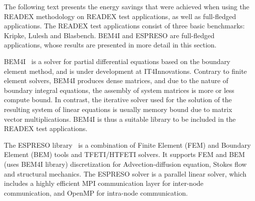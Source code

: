 
The following text presents the energy savings that were achieved when using the READEX methodology on READEX test applications, as well as full-fledged applications. The READEX test applications consist of three basic benchmarks: Kripke, Lulesh and Blasbench. BEM4I and ESPRESO are full-fledged applications, whose results are presented in more detail in this section. 

BEM4I~\cite{ch6_MerZap2013} is a solver for partial differential equations based on the boundary element method, and is under development at IT4Innovations. Contrary to finite element solvers, BEM4I produces dense matrices, and due to the nature of boundary integral equations, the assembly of system matrices is more or less compute bound. In contrast, the iterative solver used for the solution of the resulting system of linear equations is usually memory bound due to matrix vector multiplications. BEM4I is thus a suitable library to be included in the READEX test applications.

The ESPRESO library~\cite{ESPRESOijhpca} is a combination of Finite Element (FEM) and Boundary Element (BEM) tools and TFETI/HTFETI solvers. It supports FEM and BEM (uses BEM4I library) discretization for Advection-diffusion equation, Sto\-kes flow and structural mechanics. The ESPRESO solver is a parallel linear solver, which includes a highly efficient MPI communication layer for inter-node communication, and OpenMP for intra-node communication.

